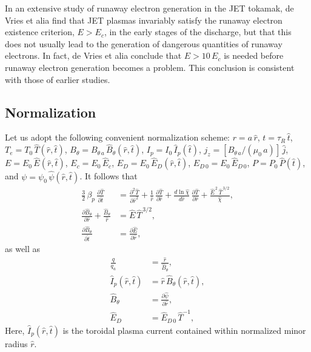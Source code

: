 \documentclass[12pt,prb,aps]{revtex4-1}
\begin{document}
 In an extensive study of runaway electron generation in the JET tokamak,\cite{run} de Vries et alia find that JET
  plasmas invariably satisfy the runaway electron existence criterion, $E>E_c$, in the early stages of the discharge, but that this does not
 usually lead to the generation of dangerous quantities of runaway electrons. In fact, de Vries et alia conclude that $E>10\,E_c$ is
 needed before runaway electron generation becomes a problem. This conclusion is consistent with those of earlier
 studies.\cite{granetz,paz,pop}
 
\subsection{Normalization}
 Let us adopt the following convenient normalization scheme: $r=a\,\hat{r}$, $t=\tau_R\,\hat{t}$, $T_e=T_0\,\hat{T}(\hat{r},\hat{t})$, $B_\theta=B_{\theta\,a}\,\hat{B}_\theta(\hat{r},\hat{t})$,
 $I_p=I_0\,\hat{I}_p(\hat{t})$, $j_z=[B_{\theta\,a}/(\mu_0\,a)]\,\hat{j}$, $E=E_0\,\hat{E}(\hat{r},\hat{t})$, $E_c= E_0\,\hat{E}_c$, $E_D= E_0\,\hat{E}_D(\hat{r},\hat{t})$, $E_{D\,0}=E_0\,\hat{E}_{D\,0}$, $P= P_0\,\hat{P}(\hat{t})$,  and
 $\psi=\psi_0\,\hat{\psi}(\hat{r},\hat{t})$. It follows that 
 \begin{align}\label{e25}
\frac{3}{2}\,\beta_p\,\frac{\partial \hat{T}}{\partial\hat{t}}&=
 \frac{\partial^2\hat{T}}{\partial \hat{r}^2} 
 +\frac{1}{\hat{r}}\,\frac{\partial\hat{T}}{\partial\hat{r}} + \frac{d\ln\hat{\chi}}{d\hat{r}}\,\frac{\partial\hat{T}}{\partial\hat{r}}
 + \frac{\hat{E}^{\,2}\,\hat{T}^{\,3/2}}{\hat{\chi}},\\[0.5ex]
\frac{\partial\hat{B}_\theta}{\partial \hat{r}} + \frac{\hat{B}_\theta}{\hat{r}}&= \hat{E}\,\hat{T}^{\,3/2},\\[0.5ex]
\frac{\partial\hat{B}_\theta}{\partial\hat{t}}&= \frac{\partial\hat{E}}{\partial\hat{r}},\label{e27}
 \end{align}
 as well as
 \begin{align}
 \frac{q}{q_a}&= \frac{\hat{r}}{\hat{B}_\theta},\label{e28}\\[0.5ex]
 \hat{I}_p(\hat{r},\hat{t})&= \hat{r}\,\hat{B}_\theta(\hat{r},\hat{t}),\label{e29}\\[0.5ex]
 \hat{B}_\theta &=\frac{\partial\hat{\psi}}{\partial\hat{r}},\label{e30}\\[0.5ex]
 \hat{E}_D&= \hat{E}_{D\,0}\,\hat{T}^{-1},
 \end{align}
 Here, $\hat{I}_p(\hat{r},\hat{t})$ is the toroidal plasma current contained within normalized minor radius $\hat{r}$. 
\end{document}
